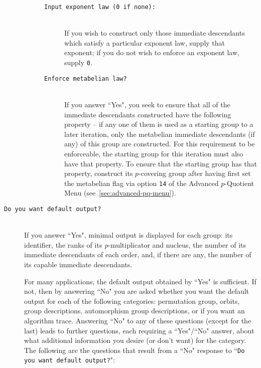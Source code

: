 \documentclass[12pt]{article}
\begin{document}
\begin{description}
\begin{description}
\begin{description}
    \item[\texttt{Input exponent law (0 if none):}]\ \\
     If you wish to construct only those immediate descendants
     which satisfy a particular exponent law, supply that exponent; if 
     you do not wish to enforce an exponent law, supply \texttt{0}.

    \item[\texttt{Enforce metabelian law?}]\ \\
     If you answer ``Yes", you seek to ensure that all of the immediate
     descendants constructed have the following property -- if any one of them 
     is used as a starting group to a later iteration, only the metabelian
     immediate descendants (if any) of this group are constructed.
     For this requirement to be enforceable, the starting group for 
     this iteration must also have that property. To ensure that the
     starting group has that property, construct its $p$-covering group 
     after having first set the metabelian flag via option \texttt{14} of 
     the Advanced $p$-Quotient Menu (see~\ref{sec:advanced-pq-menu}).
  \end{description}
 \end{description}

\item[\texttt{Do you want default output?}]\ \\
If you answer ``Yes", minimal output is displayed for each group: 
its identifier, the ranks of its {\it p}-multiplicator and nucleus, 
the number of its immediate descendants of each order, and, if there are any,
the number of its capable immediate descendants.

For many applications, the default output obtained by ``Yes" is sufficient.
If not, then by answering ``No" you are asked whether you want the
default output for each of the following categories:
permutation group, orbits, group descriptions, automorphism group
descriptions, or if you want an algorithm trace. Answering ``No" to 
any of these questions (except for the last)
leads to further questions, each requiring a ``Yes"/``No" answer,
about what additional information you desire
(or don't want) for the category. The following are the questions that 
result from a ``No" response to ``\texttt{Do you want default output?}":


\end{description}
\end{document}
